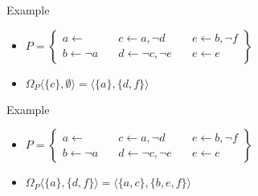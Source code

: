 \begin{frame}{Example}
  \bigskip
  \begin{itemize}
  \item
    \(
    P
    =
    \left\{
      \begin{array}{lll}
        a \leftarrow                \quad &
        c \leftarrow a, \neg d      \quad &
        e \leftarrow b, \neg f
        \\
        b \leftarrow \neg a         \quad &
        d \leftarrow \neg c, \neg e \quad &
        e \leftarrow e
      \end{array}
    \right\}
    \)
    \bigskip
    \bigskip
  \item {} \quad
    \(
    \Omega_P\langle\{c\},\emptyset \rangle=\langle\{a\},\{d,f\}\rangle
    \)
  \end{itemize}
\end{frame}
\begin{frame}{Example}
  \bigskip
  \begin{itemize}
  \item<1->
    \(
    P
    =
    \left\{
      \begin{array}{lll}
        a \leftarrow                \quad &
        c \leftarrow a, \neg d      \quad &
        e \leftarrow b, \neg f
        \\
        b \leftarrow \neg a         \quad &
        d \leftarrow \neg c, \neg e \quad &
        e \leftarrow e
      \end{array}
    \right\}
    \)
    \bigskip
    \bigskip
  \item {} \quad
    \(
    \Omega_P\langle\{a\},\{d,f\}\rangle=\langle\{a,c\},\{b,e,f\}\rangle
    \)
  \end{itemize}
\end{frame}
%
